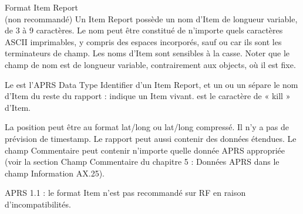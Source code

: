 \begin{aprssideblock}{Format Item Report\\(non recommandé)}
Un Item Report possède un nom d'Item de longueur variable, de 3 à
9 caractères. Le nom peut être constitué de n'importe quels caractères
ASCII imprimables, y compris des espaces incorporés, sauf \lit{!} ou
\lit{\_} car ils sont les terminateurs de champ. Les noms d'Item sont
sensibles à la casse. Noter que le champ de nom est de longueur variable,
contrairement aux objects, où il est fixe.

Le \lit{)} est l'APRS Data Type Identifier d'un Item Report, et un
\lit{!} ou un \lit{\_} sépare le nom d'Item du reste du rapport :
\lit{!} indique un Item vivant. \lit{\_} est le caractère de « kill »
d'Item.

La position peut être au format lat/long ou lat/long compressé. Il n'y a
pas de prévision de timestamp. Le rapport peut aussi contenir des données
étendues. Le champ Commentaire peut contenir n'importe quelle donnée APRS
appropriée (voir la section Champ Commentaire du chapitre 5 : Données APRS
dans le champ Information AX.25).

APRS 1.1 : le format Item n'est pas recommandé sur RF en raison
d'incompatibilités.
\end{aprssideblock}

